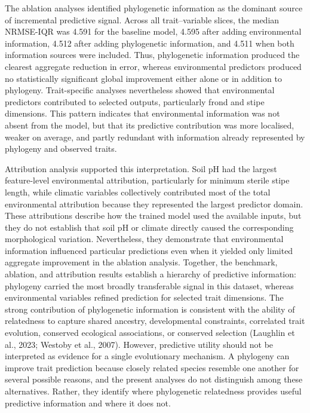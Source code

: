 \documentclass[preprint,12pt,authoryear]{elsarticle}
\begin{document}
The ablation analyses identified phylogenetic information as the dominant source of incremental predictive signal. Across all trait–variable slices, the median NRMSE-IQR was 4.591 for the baseline model, 4.595 after adding environmental information, 4.512 after adding phylogenetic information, and 4.511 when both information sources were included. Thus, phylogenetic information produced the clearest aggregate reduction in error, whereas environmental predictors produced no statistically significant global improvement either alone or in addition to phylogeny. Trait-specific analyses nevertheless showed that environmental predictors contributed to selected outputs, particularly frond and stipe dimensions. This pattern indicates that environmental information was not absent from the model, but that its predictive contribution was more localised, weaker on average, and partly redundant with information already represented by phylogeny and observed traits.

Attribution analysis supported this interpretation. Soil pH had the largest feature-level environmental attribution, particularly for minimum sterile stipe length, while climatic variables collectively contributed most of the total environmental attribution because they represented the largest predictor domain. These attributions describe how the trained model used the available inputs, but they do not establish that soil pH or climate directly caused the corresponding morphological variation. Nevertheless, they demonstrate that environmental information influenced particular predictions even when it yielded only limited aggregate improvement in the ablation analysis. Together, the benchmark, ablation, and attribution results establish a hierarchy of predictive information: phylogeny carried the most broadly transferable signal in this dataset, whereas environmental variables refined prediction for selected trait dimensions. The strong contribution of phylogenetic information is consistent with the ability of relatedness to capture shared ancestry, developmental constraints, correlated trait evolution, conserved ecological associations, or conserved selection (Laughlin et al., 2023; Westoby et al., 2007). However, predictive utility should not be interpreted as evidence for a single evolutionary mechanism. A phylogeny can improve trait prediction because closely related species resemble one another for several possible reasons, and the present analyses do not distinguish among these alternatives. Rather, they identify where phylogenetic relatedness provides useful predictive information and where it does not.
\end{document}

